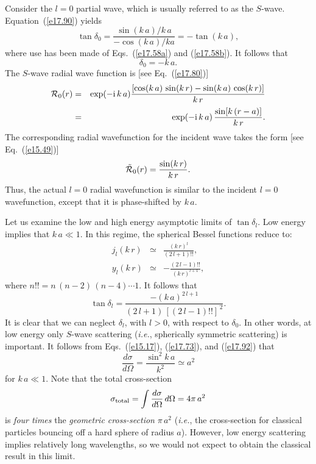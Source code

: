 Consider the $l=0$ partial wave, which is usually referred to as the $S$-wave.
Equation~(\ref{e17.90}) yields
\begin{equation}
\tan\delta_0 = \frac{\sin (k\,a)/k\,a}{-\cos (k\,a)/ka} = -\tan (k\,a),
\end{equation}
where use has been made of Eqs.~(\ref{e17.58a}) and (\ref{e17.58b}). It follows that
\begin{equation}\label{e17.92}
\delta_0 = -k\,a.
\end{equation}
The  $S$-wave radial wave function
is [see Eq.~(\ref{e17.80})]
\begin{eqnarray}
{\cal R}_0(r) &= &\exp(-{\rm i}\, k\,a) \frac{[\cos (k\,a) \,\sin (k\,r)
-\sin (k\,a) \,\cos (k\,r)]}{k\,r}\nonumber\\[0.5ex]
&=& \exp(-{\rm i}\, k\,a)\, \frac{ \sin[k\,(r-a)]}{k\,r}.
\end{eqnarray}
The corresponding radial wavefunction for the incident wave 
takes the form [see Eq.~(\ref{e15.49})]
\begin{equation}
\tilde{\cal R}_0(r) = \frac{ \sin (k\,r)}{k\,r}.
\end{equation}
Thus,  the actual $l=0$ radial wavefunction is similar to the
incident $l=0$ wavefunction, except that it is phase-shifted by $k\,a$. 

Let us examine the low and high energy asymptotic limits of $\tan\delta_l$.
Low energy implies that $k\,a\ll 1$. In this regime, the spherical Bessel functions
reduce to:
\begin{eqnarray}
j_l(k\,r) &\simeq & \frac{(k\,r)^l}{(2\,l+1)!!},\\[0.5ex]
y_l(k\,r) &\simeq & -\frac{(2\,l-1)!!}{(k\,r)^{l+1}},
\end{eqnarray}
where $n!! = n\,(n-2)\,(n-4)\cdots 1$. It follows that
\begin{equation}
\tan\delta_l = \frac{-(k\,a)^{2\,l+1}}{(2\,l+1) \,[(2\,l-1)!!]^{\,2}}.
\end{equation}
It is clear that we can neglect  $\delta_l$, with $l>0$, with respect to
$\delta_0$. In other words, at low energy only $S$-wave scattering
({\em i.e.}, spherically symmetric scattering) is important. It follows
from Eqs.~(\ref{e15.17}), (\ref{e17.73}), and (\ref{e17.92})  that 
\begin{equation}
\frac{d\sigma}{d\Omega} = \frac{\sin^2 k\,a}{k^2} \simeq a^2
\end{equation}
for $k\,a\ll 1$. Note that the total cross-section
\begin{equation}
\sigma_{\rm total} = \int\frac{d\sigma}{d\Omega}\,d\Omega = 4\pi \,a^2
\end{equation}
is {\em four times}\/ the {\em geometric cross-section}\/ $\pi \,a^2$
({\em i.e.}, the cross-section for classical particles bouncing off a
hard sphere of radius $a$). 
However, 
low energy scattering implies relatively long wavelengths, so we would not
expect to obtain the  classical result  in this limit. 

